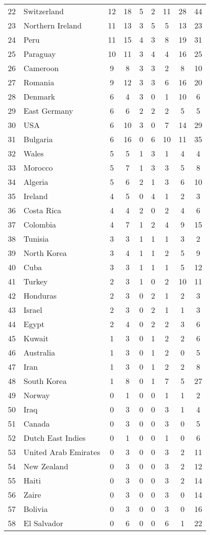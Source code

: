 \begin{figure}[H]
\begin{tabular}{r l c c c c c c c}
22 & Switzerland & 12 & 18 & 5 & 2 & 11 & 28 & 44 \\
23 & Northern Ireland & 11 & 13 & 3 & 5 & 5 & 13 & 23 \\
24 & Peru & 11 & 15 & 4 & 3 & 8 & 19 & 31 \\
25 & Paraguay & 10 & 11 & 3 & 4 & 4 & 16 & 25 \\
26 & Cameroon & 9 & 8 & 3 & 3 & 2 & 8 & 10 \\
27 & Romania & 9 & 12 & 3 & 3 & 6 & 16 & 20 \\
28 & Denmark & 6 & 4 & 3 & 0 & 1 & 10 & 6 \\
29 & East Germany & 6 & 6 & 2 & 2 & 2 & 5 & 5 \\
30 & USA & 6 & 10 & 3 & 0 & 7 & 14 & 29 \\
31 & Bulgaria & 6 & 16 & 0 & 6 & 10 & 11 & 35 \\
32 & Wales & 5 & 5 &1 & 3 & 1 & 4 & 4 \\
33 & Morocco & 5 & 7 & 1 & 3 & 3 & 5 & 8 \\
34 & Algeria & 5 & 6 & 2 & 1 & 3 & 6 & 10 \\
35 & Ireland & 4 & 5 & 0 & 4 & 1 & 2 & 3 \\
36 & Costa Rica & 4 & 4 & 2 &0 & 2 & 4 & 6 \\
37 & Colombia & 4 & 7 & 1 & 2 & 4 & 9 & 15 \\
38 & Tunisia & 3 & 3 & 1 &1 & 1 & 3 & 2 \\
39 & North Korea & 3 & 4 & 1 & 1 & 2 & 5 & 9 \\
40 & Cuba & 3 & 3 & 1 & 1 & 1 & 5 & 12 \\
41 & Turkey & 2 & 3 & 1 & 0 & 2 & 10 & 11 \\
42 & Honduras & 2 & 3 & 0 & 2 & 1 & 2 & 3 \\
43 & Israel & 2 & 3 & 0 & 2 & 1 & 1 & 3 \\
44 & Egypt & 2 & 4 & 0 & 2 & 2 & 3 & 6 \\
45 & Kuwait & 1 & 3 & 0 & 1 & 2 & 2 & 6 \\
46 & Australia & 1 & 3 & 0 & 1 & 2 & 0 & 5 \\
47 & Iran & 1 & 3 & 0 & 1 & 2 & 2 & 8 \\
48 & South Korea & 1 & 8 & 0 & 1 & 7 & 5 & 27 \\
49 & Norway & 0 & 1 & 0 & 0 & 1 & 1 & 2 \\
50 & Iraq & 0 & 3 & 0 & 0 & 3 & 1 & 4 \\
51 & Canada & 0 & 3 & 0 & 0 & 3 & 0 & 5 \\
52 & Dutch East Indies & 0 & 1 & 0 & 0 & 1 & 0 & 6 \\
53 & United Arab Emirates & 0 & 3 & 0 & 0 & 3 & 2 & 11 \\
54 & New Zealand & 0 & 3 & 0 & 0 & 3 & 2 & 12 \\
55 & Haiti & 0 & 3 & 0 & 0 & 3 & 2 & 14 \\
56 & Zaire & 0 & 3 & 0 & 0 & 3 & 0 & 14 \\
57 & Bolivia & 0 & 3 & 0 & 0 & 3 & 0 & 16 \\
58 & El Salvador & 0 & 6 & 0 & 0 & 6 & 1 & 22 \\ \hline
\end{tabular}
\end{figure}
\normalsize
